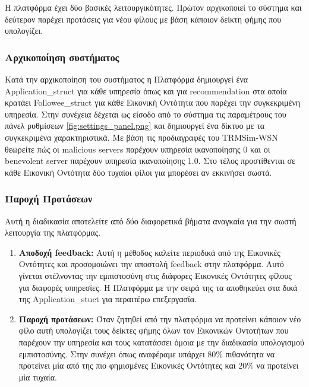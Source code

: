 H πλατφόρμα έχει δύο βασικές λειτουργικότητες. Πρώτον αρχικοποιεί το σύστημα και δεύτερον παρέχει προτάσεις για νέου φίλους με βάση κάποιον δείκτη φήμης που υπολογίζει.

\subsubsection{Αρχικοποίηση συστήματος}

Κατά την αρχικοποίηση του συστήματος η Πλατφόρμα δημιουργεί ένα Application\_struct  για κάθε υπηρεσία όπως και για recommendation στα οποία κρατάει Followee\_struct για κάθε Εικονική Οντότητα που παρέχει την συγκεκριμένη υπηρεσία.
 Στην συνέχεια δέχεται ως είσοδο από το σύστημα τις παραμέτρους του πάνελ ρυθμίσεων \ref{fig:settings_panel.png} και δημιουργεί ένα δίκτυο με τα συγκεκριμένα χαρακτηριστικά. Με βάση τις προδιαγραφές του TRMSim-WSN θεωρείτε πώς οι malicious servers παρέχουν υπηρεσία ικανοποίησης 0 και οι benevolent server παρέχουν υπηρεσία ικανοποίησης 1.0.
  Στο τέλος προστίθενται σε κάθε Εικονική Οντότητα δύο τυχαίοι φίλοι για μπορέσει αν εκκινήσει σωστά.
\newpage

\subsubsection{Παροχή Προτάσεων}

Αυτή η διαδικασία αποτελείτε από δύο διαφορετικά βήματα αναγκαία για την σωστή λειτουργία της πλατφόρμας.

\begin{enumerate}
\item \textbf{Αποδοχή feedback:} Αυτή η μέθοδος καλείτε περιοδικά από της Εικονικές Οντότητες και προσομοιώνει την αποστολή feedback στην πλατφόρμα. Αυτό γίνεται στέλνοντας την εμπιστοσύνη στις διάφορες Εικονικές Οντότητες φίλους για διαφορές υπηρεσίες. Η Πλατφόρμα με την σειρά της τα αποθηκεύει στα δικά της Application\_stuct για περαιτέρω επεξεργασία.

\item\textbf{Παροχή προτάσεων:} Όταν ζητηθεί από την πλατφόρμα να προτείνει κάποιον νέο φίλο αυτή υπολογίζει τους δείκτες φήμης όλων τον Εικονικών Οντοτήτων που παρέχουν την υπηρεσία και τους κατατάσσει όμοια με την διαδικασία υπολογισμού εμπιστοσύνης. Στην συνέχει όπως αναφέραμε υπάρχει 80\% πιθανότητα να προτείνει μία από της πιο φημισμένες Εικονικές Οντότητες και 20\% να προτείνει μία τυχαία.
\end{enumerate}

